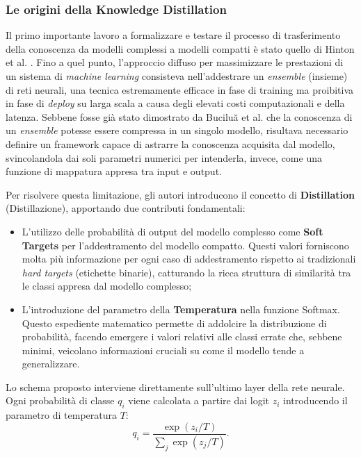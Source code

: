\subsubsection{Le origini della Knowledge Distillation}
Il primo importante lavoro a formalizzare e testare il processo di
trasferimento della conoscenza da modelli complessi a modelli compatti è stato
quello di Hinton et al. \cite{hinton2015distilling}. Fino a quel punto,
l'approccio diffuso per massimizzare le prestazioni di un sistema di
\textit{machine learning} consisteva nell'addestrare un \textit{ensemble}
(insieme) di reti neurali, una tecnica estremamente efficace in fase di
training ma proibitiva in fase di \textit{deploy} su larga scala a causa degli
elevati costi computazionali e della latenza. Sebbene fosse già stato
dimostrato da Buciluă et al. \cite{buciluǎ2006model} che la conoscenza di un
\textit{ensemble} potesse essere compressa in un singolo modello, risultava
necessario definire un framework capace di astrarre la conoscenza acquisita dal
modello, svincolandola dai soli parametri numerici per intenderla, invece, come
una funzione di mappatura appresa tra input e output. \par
Per risolvere questa limitazione, gli autori introducono il concetto di
\textbf{Distillation} (Distillazione), apportando due contributi fondamentali:
\begin{itemize}
    \item L'utilizzo delle probabilità di output del modello complesso come \textbf{Soft
              Targets} per l'addestramento del modello compatto. Questi valori forniscono
          molta più informazione per ogni caso di addestramento rispetto ai tradizionali
          \textit{hard targets} (etichette binarie), catturando la ricca struttura di
          similarità tra le classi appresa dal modello complesso;
    \item L'introduzione del parametro della \textbf{Temperatura} nella funzione Softmax.
          Questo espediente matematico permette di addolcire la distribuzione di
          probabilità, facendo emergere i valori relativi alle classi errate che, sebbene
          minimi, veicolano informazioni cruciali su come il modello tende a
          generalizzare.
\end{itemize}
Lo schema proposto interviene direttamente sull'ultimo layer della rete neurale. Ogni probabilità di classe $q_i$ viene calcolata a partire dai logit $z_i$ introducendo il parametro di temperatura $T$:
\begin{equation}
    q_i = \frac{\exp(z_i/T)}{\sum_{j} \exp(z_j/T)}.
\end{equation}
